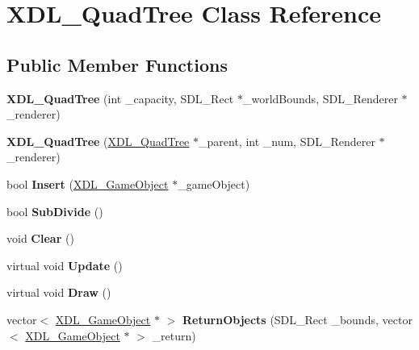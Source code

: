 \hypertarget{class_x_d_l___quad_tree}{\section{X\-D\-L\-\_\-\-Quad\-Tree Class Reference}
\label{class_x_d_l___quad_tree}
}
\subsection*{Public Member Functions}
\begin{DoxyCompactItemize}
\item 
\hypertarget{class_x_d_l___quad_tree_ada4c02658b4958cad2d9dd31ad8b2680}{{\bfseries X\-D\-L\-\_\-\-Quad\-Tree} (int \-\_\-capacity, S\-D\-L\-\_\-\-Rect $\ast$\-\_\-world\-Bounds, S\-D\-L\-\_\-\-Renderer $\ast$\-\_\-renderer)}\label{class_x_d_l___quad_tree_ada4c02658b4958cad2d9dd31ad8b2680}

\item 
\hypertarget{class_x_d_l___quad_tree_a55f72dd4272a6061d6e187fcb1e3cb90}{{\bfseries X\-D\-L\-\_\-\-Quad\-Tree} (\hyperlink{class_x_d_l___quad_tree}{X\-D\-L\-\_\-\-Quad\-Tree} $\ast$\-\_\-parent, int \-\_\-num, S\-D\-L\-\_\-\-Renderer $\ast$\-\_\-renderer)}\label{class_x_d_l___quad_tree_a55f72dd4272a6061d6e187fcb1e3cb90}

\item 
\hypertarget{class_x_d_l___quad_tree_ac664cd1febc52583ed363a0843b8fa34}{bool {\bfseries Insert} (\hyperlink{class_x_d_l___game_object}{X\-D\-L\-\_\-\-Game\-Object} $\ast$\-\_\-game\-Object)}\label{class_x_d_l___quad_tree_ac664cd1febc52583ed363a0843b8fa34}

\item 
\hypertarget{class_x_d_l___quad_tree_a7791f2dbdc6cea5f10ff6c46e70168a7}{bool {\bfseries Sub\-Divide} ()}\label{class_x_d_l___quad_tree_a7791f2dbdc6cea5f10ff6c46e70168a7}

\item 
\hypertarget{class_x_d_l___quad_tree_ab1a709a79305c97a29582231ee5ffb05}{void {\bfseries Clear} ()}\label{class_x_d_l___quad_tree_ab1a709a79305c97a29582231ee5ffb05}

\item 
\hypertarget{class_x_d_l___quad_tree_a6f25cfb2703d0cff20c768b076cc0217}{virtual void {\bfseries Update} ()}\label{class_x_d_l___quad_tree_a6f25cfb2703d0cff20c768b076cc0217}

\item 
\hypertarget{class_x_d_l___quad_tree_ac4317b413f1e4a6caa5f2cea388b340d}{virtual void {\bfseries Draw} ()}\label{class_x_d_l___quad_tree_ac4317b413f1e4a6caa5f2cea388b340d}

\item 
\hypertarget{class_x_d_l___quad_tree_ade23e7dd742710303e4a9d0a7ba24236}{vector$<$ \hyperlink{class_x_d_l___game_object}{X\-D\-L\-\_\-\-Game\-Object} $\ast$ $>$ {\bfseries Return\-Objects} (S\-D\-L\-\_\-\-Rect \-\_\-bounds, vector$<$ \hyperlink{class_x_d_l___game_object}{X\-D\-L\-\_\-\-Game\-Object} $\ast$ $>$ \-\_\-return)}\label{class_x_d_l___quad_tree_ade23e7dd742710303e4a9d0a7ba24236}

\end{DoxyCompactItemize}
